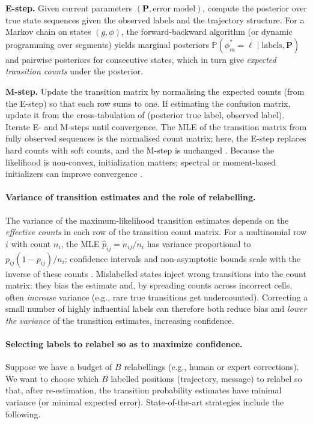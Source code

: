 \textbf{E-step.} Given current parameters $(\mathbf{P}, \text{error model})$, compute the posterior over true state sequences given the observed labels and the trajectory structure. For a Markov chain on states $(g, \phi)$, the forward-backward algorithm (or dynamic programming over segments) yields marginal posteriors $\mathbb{P}(\phi^*_m = \ell \mid \text{labels}, \mathbf{P})$ and pairwise posteriors for consecutive states, which in turn give \emph{expected transition counts} under the posterior.

\textbf{M-step.} Update the transition matrix by normalising the expected counts (from the E-step) so that each row sums to one. If estimating the confusion matrix, update it from the cross-tabulation of (posterior true label, observed label). Iterate E- and M-steps until convergence. The MLE of the transition matrix from fully observed sequences is the normalised count matrix; here, the E-step replaces hard counts with soft counts, and the M-step is unchanged \citep{dawid1979maximum}. Because the likelihood is non-convex, initialization matters; spectral or moment-based initializers can improve convergence \citep{zhang2016spectral}.

\paragraph{Variance of transition estimates and the role of relabelling.}
The variance of the maximum-likelihood transition estimates depends on the \emph{effective counts} in each row of the transition count matrix. For a multinomial row $i$ with count $n_i$, the MLE $\widehat{p}_{ij} = n_{ij}/n_i$ has variance proportional to $p_{ij}(1-p_{ij})/n_i$; confidence intervals and non-asymptotic bounds scale with the inverse of these counts \citep{noe2009estimating, huang2024nonasymptotic}. Mislabelled states inject wrong transitions into the count matrix: they bias the estimate and, by spreading counts across incorrect cells, often \emph{increase} variance (e.g., rare true transitions get undercounted). Correcting a small number of highly influential labels can therefore both reduce bias and \emph{lower the variance} of the transition estimates, increasing confidence.

\paragraph{Selecting labels to relabel so as to maximize confidence.}
Suppose we have a budget of $B$ relabellings (e.g., human or expert corrections). We want to choose which $B$ labelled positions (trajectory, message) to relabel so that, after re-estimation, the transition probability estimates have minimal variance (or minimal expected error). State-of-the-art strategies include the following.

